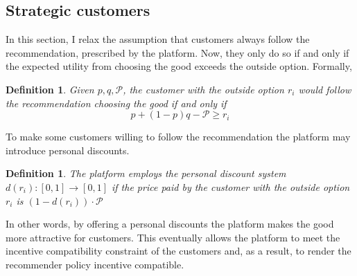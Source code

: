 \documentclass[a4paper]{article}
\newtheorem{definition}[theorem]{Definition}
\begin{document}
\subsection{Strategic customers}
In this section, I relax the assumption that customers always follow the recommendation, prescribed by the platform. Now, they only do so if and only if the expected utility from choosing the good exceeds the outside option. Formally, 
\begin{definition}
	Given $p, q, \mathcal{P}$, the customer with the outside option $r_i$ would follow the recommendation choosing the good if and only if $$p + (1-p)q - \mathcal{P} \ge r_i$$
\end{definition}

To make some customers willing to follow the recommendation the platform may introduce personal discounts.
\begin{definition}
	The platform employs the personal discount system $d(r_i): [0, 1] \to [0, 1]$ if the price paid by the customer with the outside option $r_i$ is $(1-d(r_i)) \cdot \mathcal{P}$
\end{definition}
In other words, by offering a personal discounts the platform makes the good more attractive for  customers. This eventually allows the platform to meet the incentive compatibility constraint of the customers and, as a result, to render the recommender policy incentive compatible.
\end{document}
